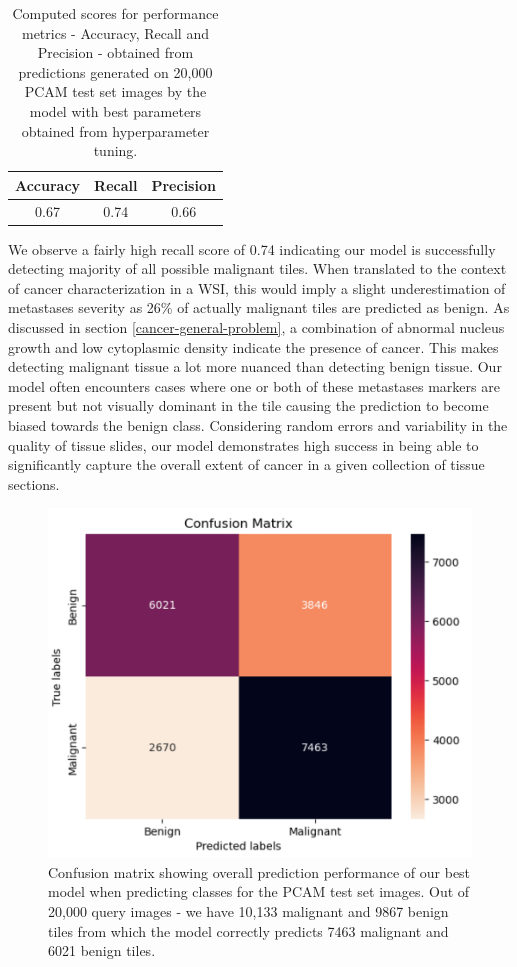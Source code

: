 \documentclass{l4proj}
\begin{document}
\begin{table}[h]
    \centering
    \begin{tabular}{c|c|c}
         Accuracy&Recall&Precision  \\ \hline
         0.67&0.74&0.66 
    \end{tabular}
    \caption{Computed scores for performance metrics - Accuracy, Recall and Precision - obtained from predictions generated on 20,000 PCAM test set images by the model with best parameters obtained from hyperparameter tuning.}
    \label{tab:metric-data}
\end{table}

We observe a fairly high recall score of 0.74 indicating our model is successfully detecting majority of all possible malignant tiles. When translated to the context of cancer characterization in a WSI, this would imply a slight underestimation of metastases severity as 26\% of actually malignant tiles are predicted as benign. As discussed in section \ref{cancer-general-problem}, a combination of abnormal nucleus growth and low cytoplasmic density indicate the presence of cancer. This makes detecting malignant tissue a lot more nuanced than detecting benign tissue. Our model often encounters cases where one or both of these metastases markers are present but not visually dominant in the tile causing the prediction to become biased towards the benign class. Considering random errors and variability in the quality of tissue slides, our model demonstrates high success in being able to significantly capture the overall extent of cancer in a given collection of tissue sections. 

\begin{figure}[h]
    \centering
    \includegraphics[scale=0.5]{images/confusion-matrix.png}
    \caption{Confusion matrix showing overall prediction performance of our best model when predicting classes for the PCAM test set images. Out of 20,000 query images - we have 10,133 malignant and 9867 benign tiles from which the model correctly predicts 7463 malignant and 6021 benign tiles.}
    \label{fig:result-conf-mat}
\end{figure}
\end{document}
